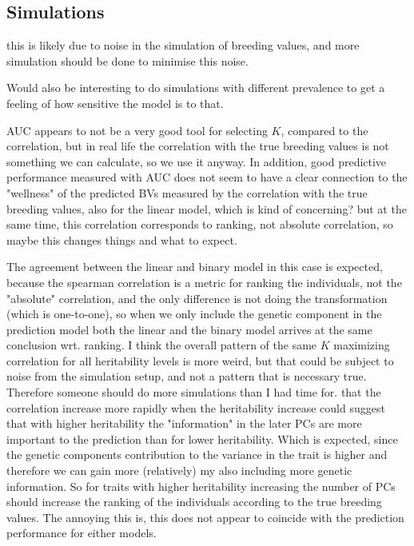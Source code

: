 

\subsection{Simulations}
this is likely due to noise in the simulation of breeding values, and more simulation should be done to minimise this noise.

Would also be interesting to do simulations with different prevalence to get a feeling of how sensitive the model is to that.  

AUC appears to not be a very good tool for selecting $K$, compared to the correlation, but in real life the correlation with the true breeding values is not something we can calculate, so we use it anyway. In addition, good predictive performance measured with AUC does not seem to have a clear connection to the "wellness" of the predicted BVs measured by the correlation with the true breeding values, also for the linear model, which is kind of concerning? but at the same time, this correlation corresponds to ranking, not absolute correlation, so maybe this changes things and what to expect. 

The agreement between the linear and binary model in this case is expected, because the spearman correlation is a metric for ranking the individuals, not the "absolute" correlation, and the only difference is not doing the transformation (which is one-to-one), so when we only include the genetic component in the prediction model both the linear and the binary model arrives at the same conclusion wrt. ranking. 
%
I think the overall pattern of the same $K$ maximizing correlation for all heritability levels is more weird, but that could be subject to noise from the simulation setup, and not a pattern that is necessary true. Therefore someone should do more simulations than I had time for. 
%
that the correlation increase more rapidly when the heritability increase could suggest that with higher heritability the "information" in the later PCs are more important to the prediction than for lower heritability. Which is expected, since the genetic components contribution to the variance in the trait is higher and therefore we can gain more (relatively) my also including more genetic information. So for traits with higher heritability increasing the number of PCs should increase the ranking of the individuals according to the true breeding values. The annoying this is, this does not appear to coincide with the prediction performance for either models. 


